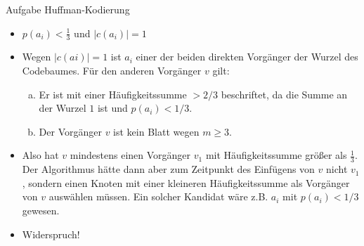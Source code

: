 \begin{frame}[allowframebreaks]{Aufgabe \thesection}{Huffman-Kodierung}
  \begin{requirementsnoinc}
    \begin{itemize}
      \item $p(a_{i})< \frac{1}{3}$ und $|c(a_{i})|=1$
    \end{itemize}
  \end{requirementsnoinc}
  \begin{solutionnoinc}
    \begin{itemize}
      \item Wegen $|c(ai )| = 1$ ist $a_i$ einer der beiden direkten Vorgänger der Wurzel des Codebaumes. Für den anderen Vorgänger $v$ gilt:
      \begin{enumerate}[a)]
        \item Er ist mit einer Häufigkeitssumme $> 2/3$ beschriftet, da die Summe an der Wurzel $1$ ist und $p(a_i) < 1/3$.
        \item Der Vorgänger $v$ ist kein Blatt wegen $m \ge 3$.
      \end{enumerate}
      \item Also hat $v$ mindestens einen Vorgänger $v_1$ mit Häufigkeitssumme größer als $\frac{1}{3}$. Der Algorithmus hätte dann aber zum Zeitpunkt des Einfügens von $v$ nicht $v_1$, sondern einen Knoten mit einer kleineren Häufigkeitssumme als Vorgänger von $v$ auswählen müssen. Ein solcher Kandidat wäre z.B. $a_i$ mit $p(a_i) < 1/3$ gewesen.
      \item Widerspruch!
    \end{itemize}
  \end{solutionnoinc}
  \begin{solutionnoinc}
  \end{solutionnoinc}
\end{frame}
